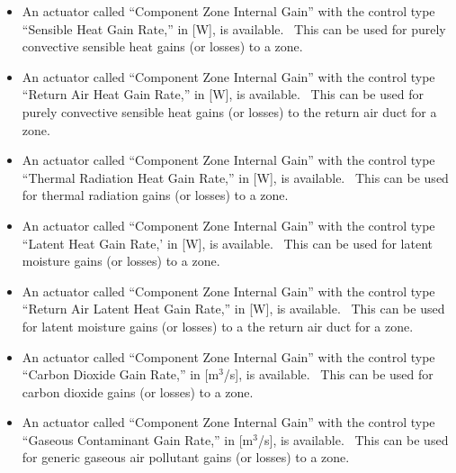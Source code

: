 \begin{itemize}
\item
  An actuator called ``Component Zone Internal Gain'' with the control type ``Sensible Heat Gain Rate,'' in {[}W{]}, is available.~ This can be used for purely convective sensible heat gains (or losses) to a zone.
\item
  An actuator called ``Component Zone Internal Gain'' with the control type ``Return Air Heat Gain Rate,'' in {[}W{]}, is available.~ This can be used for purely convective sensible heat gains (or losses) to the return air duct for a zone.
\item
  An actuator called ``Component Zone Internal Gain'' with the control type ``Thermal Radiation Heat Gain Rate,'' in {[}W{]}, is available.~ This can be used for thermal radiation gains (or losses) to a zone.
\item
  An actuator called ``Component Zone Internal Gain'' with the control type ``Latent Heat Gain Rate,' in {[}W{]}, is available.~ This can be used for latent moisture gains (or losses) to a zone.
\item
  An actuator called ``Component Zone Internal Gain'' with the control type ``Return Air Latent Heat Gain Rate,'' in {[}W{]}, is available.~ This can be used for latent moisture gains (or losses) to a the return air duct for a zone.
\item
  An actuator called ``Component Zone Internal Gain'' with the control type ``Carbon Dioxide Gain Rate,'' in {[}m\(^{3}\)/s{]}, is available.~ This can be used for carbon dioxide gains (or losses) to a zone.
\item
  An actuator called ``Component Zone Internal Gain'' with the control type ``Gaseous Contaminant Gain Rate,'' in {[}m\(^{3}\)/s{]}, is available.~ This can be used for generic gaseous air pollutant gains (or losses) to a zone.
\end{itemize}
